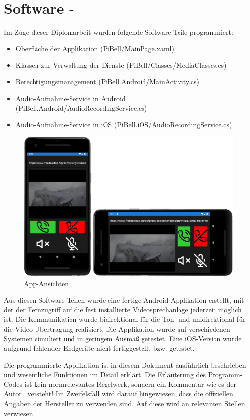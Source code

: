 \section{Software - \AndreasGrain}
Im Zuge dieser Diplomarbeit wurden folgende Software-Teile programmiert:
\begin{itemize}
    \item Oberfläche der Applikation (PiBell/MainPage.xaml)
    \item Klassen zur Verwaltung der Dienste (PiBell/Classes/MediaClasses.cs)
    \item Berechtigungsmanagement (PiBell.Android/MainActivity.cs)
    \item Audio-Aufnahme-Service in Android (PiBell.Android/AudioRecordingService.cs)
    \item Audio-Aufnahme-Service in iOS (PiBell.iOS/AudioRecordingService.cs)
\end{itemize}

\begin{figure}[htbp!]
    \centering
    \includegraphics[width=.9\linewidth]{images/projektergebnis/ansichtenFinaleApp.png}
    \caption{App-Ansichten}
\end{figure}

Aus diesen Software-Teilen wurde eine fertige Android-Applikation erstellt, mit der der Fernzugriff auf die fest installierte Videosprechanlage jederzeit möglich ist.
Die Kommunikation wurde bidirektional für die Ton- und unidirektional für die Video-Übertragung realisiert.
Die Applikation wurde auf verschiedenen Systemen simuliert und in geringem Ausmaß getestet.
Eine iOS-Version wurde aufgrund fehlender Endgeräte nicht fertiggestellt bzw. getestet.\par

Die programmierte Applikation ist in diesem Dokument ausführlich beschrieben und wesentliche Funktionen im Detail erklärt.
Die Erläuterung des Programm-Codes ist kein normrelevantes Regelwerk, sondern ein Kommentar wie es der Autor \AndreasGrain\ versteht!
Im Zweifelsfall wird darauf hingewiesen, dass die offiziellen Angaben der Hersteller zu verwenden sind.
Auf diese wird an relevanten Stellen verwiesen.


